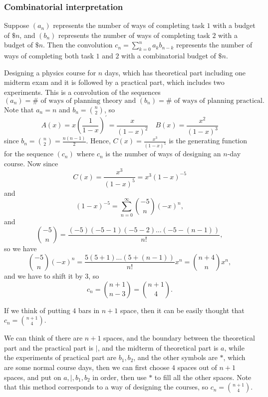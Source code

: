\subsubsection{Combinatorial interpretation}
Suppose \((a_n)\) represents the number of ways of completing task \(1\) with a budget of \(\$ n\), and \((b_n)\) represents the number of ways of completing task \(2\) with a budget of \(\$ n\). Then the convolution \(c_n = \sum_{k=0}^n a_k b_{n-k} \) represents the number of ways of completing both task \(1\) and \(2\) with a combinatorial budget of \(\$ n\). 
\begin{eg}
    Designing a physics course for \(n\) days, which has theoretical part including one midterm exam and it is followed by a practical part, which includes two experiments. This is a convolution of the sequences 
    \[
        (a_n) = \# \text{ of ways of planning theory} \text{ and } (b_n) = \# \text{ of ways of planning practical}.
    \] Note that \(a_n = n\) and \(b_n = \binom{n}{2}\), so 
    \[
        A(x) = x \left( \frac{1}{1-x} \right)^{\prime} = \frac{x}{(1-x)^2} \quad B(x) = \frac{x^2}{(1-x)^3}
    \] since \(b_n = \binom{n}{2} = \frac{n(n-1)}{2}\). Hence, \(C(x) = \frac{x^3}{(1-x)^5}\) is the generating function for the sequence \((c_n)\) where \(c_n\) is the number of ways of designing an \(n\)-day course. Now since 
    \[
        C(x) = \frac{x^3}{(1-x)^5} = x^3 (1 - x)^{-5}
    \] and 
    \[
        (1-x)^{-5} = \sum_{n=0}^{\infty} \binom{-5}{n} (-x)^n, 
    \]  and 
    \[
        \binom{-5}{n} = \frac{(-5)(-5 - 1)(-5 - 2) \dots (-5 - (n-1))}{n!},
    \] so we have 
    \[
        \binom{-5}{n} (-x)^n = \frac{5(5+1)\dots (5 + (n-1))}{n!} x^n = \binom{n+4}{n} x^n,
    \] and we have to shift it by \(3\), so 
    \[
        c_n = \binom{n+1}{n-3} = \binom{n+1}{4}.
    \] 
\end{eg}       
\begin{remark}
    If we think of putting \(4\) bars in \(n+1\) space, then it can be easily thought that \(c_n = \binom{n+1}{4}\).   
    \begin{note}
        We can think of there are \(n + 1\) spaces, and the boundary between the theoretical part and the practical part is \(\mid\), and the midterm of theoretical part is \(a\), while the experiments of practical part are \(b_1, b_2\), and the other symbols are \(*\), which are some normal course days, then we can first choose \(4\) spaces out of \(n + 1\) spaces, and put on \(a, \mid , b_1, b_2\) in order, then use \(*\) to fill all the other spaces. Note that this method corresponds to a way of designing the courses, so \(c_n = \binom{n + 1}{4}\).            
    \end{note}
\end{remark}  
